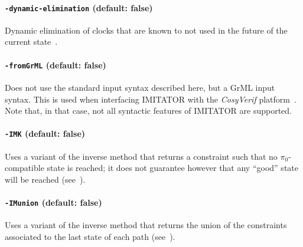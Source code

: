 \documentclass[a4paper,11pt]{report}
\newcommand{\pio}{\pi_0}
\newcommand{\CosyVerif}{\emph{CosyVerif}}
\newcommand{\imitator}{\textsf{IMITATOR}}
\newcommand{\styleOption}[1]{\textcolor{optioncolor}{\texttt{#1}}}
\begin{document}



\paragraph{\styleOption{-dynamic-elimination} (default: false)}
Dynamic elimination of clocks that are known to not used in the future of the current state~\cite{Andre13FSFMA}.




\paragraph{\styleOption{-fromGrML} (default: false)}

Does not use the standard input syntax described here, but a GrML input syntax.
This is used when interfacing \imitator{} with the \CosyVerif{} platform~\cite{AHHKLLP13}.
Note that, in that case, not all syntactic features of \imitator{} are supported.



\paragraph{\styleOption{-IMK} (default: false)}
Uses a variant of the inverse method that returns a constraint such that no $\pio$-compatible state is reached; it does not guarantee however that any ``good'' state will be reached (see~\cite{AS13}).



\paragraph{\styleOption{-IMunion} (default: false)}
Uses a variant of the inverse method that returns the union of the constraints associated to the last state of each path (see~\cite{AS13}).


\end{document}
